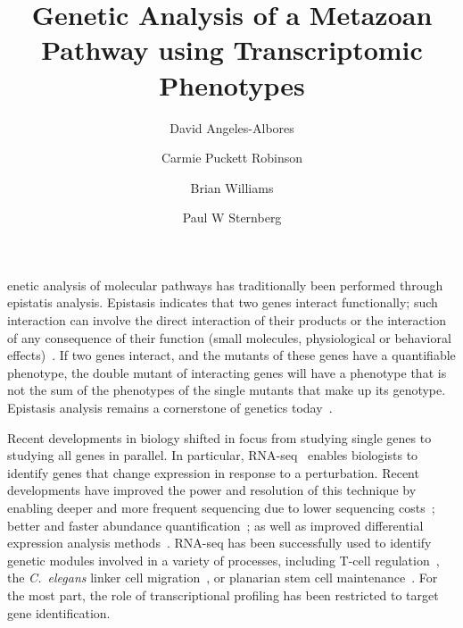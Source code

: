 \documentclass[9pt,twocolumn,twoside]{pnas-new}
\title{Genetic Analysis of a Metazoan Pathway using Transcriptomic Phenotypes}
\author[a,b,*]{David Angeles-Albores}
\author[a,b,*]{Carmie Puckett Robinson}
\author[a]{Brian Williams}
\author[a,b]{Paul W Sternberg}
\affil[a]{Division of Biology and Biological Engineering, Caltech, Pasadena, USA, 91125}
\affil[b]{Howard Hughes Medical Institute}
\affil[*]{These authors contributed equally to this manuscript}
\newcommand{\cel}{\emph{C.~elegans}}
\begin{document}
\verticaladjustment{-2pt}

\maketitle
\thispagestyle{firststyle}

enetic analysis of molecular pathways has traditionally been performed
through epistatis analysis. Epistasis indicates that two genes interact
functionally; such interaction can involve the direct interaction of their
products or the interaction of any consequence of their function (small molecules,
physiological or behavioral effects)~\cite{Huang2006}. If two
genes interact, and the mutants of these genes have a quantifiable phenotype,
the double mutant of interacting genes will have a phenotype that is not the sum
of the phenotypes of the single mutants that make up its genotype. Epistasis
analysis remains a cornerstone of genetics today~\cite{Phillips2008}.

Recent developments in biology shifted in focus from studying single
genes to studying all genes in parallel. In particular,
RNA-seq~\cite{Mortazavi2008} enables biologists to
identify genes that change expression in response to a perturbation. Recent
developments have improved the power and resolution of this technique by enabling
deeper and more frequent sequencing due to lower sequencing costs~\cite{Metzker2010};
better and faster abundance quantification~\cite{Patro2014,Bray2016,Patro2015};
as well as improved differential expression analysis
methods~\cite{Pimentel2016,Trapnell2013}. RNA-seq has been
successfully used to identify genetic modules involved in a variety of processes,
including T-cell regulation~\cite{Singer2016,Shalek2013}, the \cel{} linker
cell migration~\cite{Schwarz2012}, or planarian stem cell
maintenance~\cite{VanWolfswinkel2014,Scimone2014}. For the most part, the role of
transcriptional profiling has been restricted to target gene identification.
\end{document}
